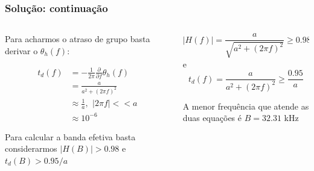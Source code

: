 \documentclass[10pt,hyperref={pdfpagemode=FullScreen},aspectratio=169]{beamer}
\begin{document}
\begin{frame}
  \frametitle{Solução: continuação}


\begin{columns}[T]

  
  \begin{column}{0.5\textwidth}
    Para acharmos o atraso de grupo basta derivar o $\theta _h (f)$: 

    \begin{align*}
    t_d(f) &= -\frac{1}{2\pi}\frac{\partial }{\partial f}\theta _h (f)  \\
       & =  \frac{a}{a^2 +( 2\pi f)^2 } \\ 
       & \approx \frac{1}{a} , \,\ |2\pi f| << a   \\
       & \approx 10^{-6}
    \end{align*}
    
    
    Para calcular a banda efetiva basta considerarmos $|H(B)|> 0.98$ e $t_d(B)> 0.95/a$
    
  \end{column}
  \begin{column}{0.5\textwidth}
    $$
|H(f)|  = \frac{a}{\sqrt{a ^2+  (2\pi f)^2 }} \geq 0.98
$$
e
$$
t_d(f)  = \frac{a}{a^2 +( 2\pi f)^2}  \geq \frac{0.95}{a}
$$

A menor frequência que atende as duas equações é $B=32.31$ \si{\kilo\hertz}
  \end{column}
\end{columns}
\end{frame}
\end{document}
